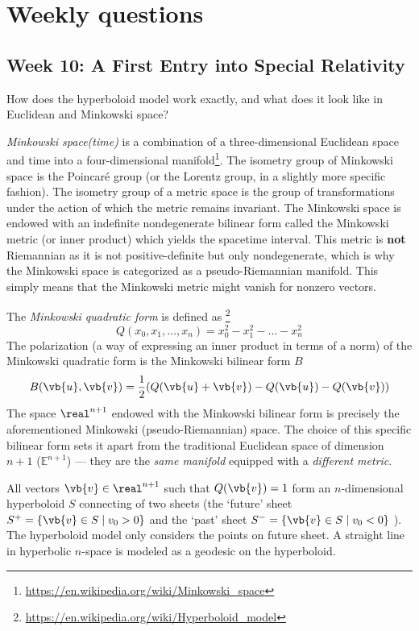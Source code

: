 \chapter{Weekly questions}

\section*{Week 10: A First Entry into Special Relativity}

\begin{question}
    How does the hyperboloid model work exactly, and what does it look like in Euclidean and Minkowski space?
\end{question}

\emph{Minkowski space(time)} is a combination of a three-dimensional Euclidean space and time into a four-dimensional manifold\footnote{\url{https://en.wikipedia.org/wiki/Minkowski_space}}. The isometry group of Minkowski space is the Poincaré group (or the Lorentz group, in a slightly more specific fashion). The isometry group of a metric space is the group of transformations under the action of which the metric remains invariant. The Minkowski space is endowed with an indefinite nondegenerate bilinear form called the Minkowski metric (or inner product) which yields the spacetime interval. This metric is \textbf{not} Riemannian as it is not positive-definite but only nondegenerate, which is why the Minkowski space is categorized as a pseudo-Riemannian manifold. This simply means that the Minkowski metric might vanish for nonzero vectors.

The \textit{Minkowski quadratic form} is defined as \footnote{\url{https://en.wikipedia.org/wiki/Hyperboloid_model}}
$$ Q(x_0, x_1, \ldots, x_n) = x_0^2 - x_1^2 - \ldots - x_n^2 $$
The polarization (a way of expressing an inner product in terms of a norm) of the Minkowski quadratic form is the Minkowski bilinear form $B$
$$ B(\vb{u}, \vb{v}) = \frac{1}{2} (Q(\vb{u} + \vb{v}) - Q(\vb{u}) - Q(\vb{v}))$$
The space $\real^{n+1}$ endowed with the Minkowski bilinear form is precisely the aforementioned Minkowski (pseudo-Riemannian) space. The choice of this specific bilinear form sets it apart from the traditional Euclidean space of dimension $n+1$ ($\mathbb{E}^{n+1}$) --- they are the \emph{same manifold} equipped with a \emph{different metric}.

All vectors $\vb{v}\in \real^{n+1}$ such that $Q(\vb{v}) = 1$ form an $n$-dimensional hyperboloid $S$ connecting of two sheets (the `future' sheet $S^{+} = \{\vb{v} \in S \mid v_0 > 0\}$ and the `past' sheet $S^{-} = \{\vb{v} \in S \mid v_0 < 0\}$ ). The hyperboloid model only considers the points on future sheet. A straight line in hyperbolic $n$-space is modeled as a geodesic on the hyperboloid. 

